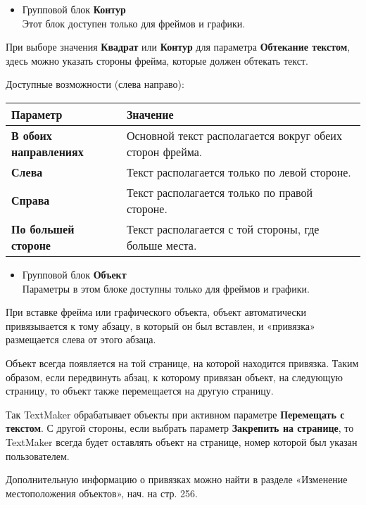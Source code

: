 \documentclass[a4paper,10pt]{article}
\begin{document}
 \begin{itemize}
  \item Групповой блок \textbf{Контур}\\
  Этот блок доступен только для фреймов и графики.
 \end{itemize}

 При выборе значения \textbf{Квадрат} или \textbf{Контур} для параметра \textbf{Обтекание текстом}, здесь можно указать стороны фрейма, которые должен обтекать текст.
 
 Доступные возможности (слева направо):
 
 \begin{center}
\begin{tabular}{  m{4cm}  m{12cm}  }
 \textbf{Параметр} & \textbf{Значение}\\ 
 \hline
  \textbf{В обоих направлениях} & Основной текст располагается вокруг обеих сторон фрейма.\\
  \textbf{Слева} & Текст располагается только по левой стороне.\\ 
\textbf{Справа} & Текст располагается только по правой стороне.\\
\textbf{По большей стороне} & Текст располагается с той стороны, где больше места.\\
\end{tabular}
\end{center}

\begin{itemize}
 \item Групповой блок \textbf{Объект}\\
 Параметры в этом блоке доступны только для фреймов и графики.
\end{itemize}

При вставке фрейма или графического объекта, объект автоматически привязывается к тому абзацу, в который он был вставлен, и «привязка» размещается слева от этого абзаца.

Объект всегда появляется на той странице, на которой находится привязка. Таким образом, если передвинуть абзац, к которому привязан объект, на следующую страницу, то объект также перемещается на другую страницу.

Так TextMaker обрабатывает объекты при активном параметре \textbf{Перемещать с текстом}.  С другой стороны, если выбрать параметр \textbf{Закрепить на странице}, то TextMaker всегда будет оставлять объект на странице, номер которой был указан пользователем.

Дополнительную информацию о привязках можно найти в разделе «Изменение местоположения объектов», нач. на стр. 256.
\end{document}
